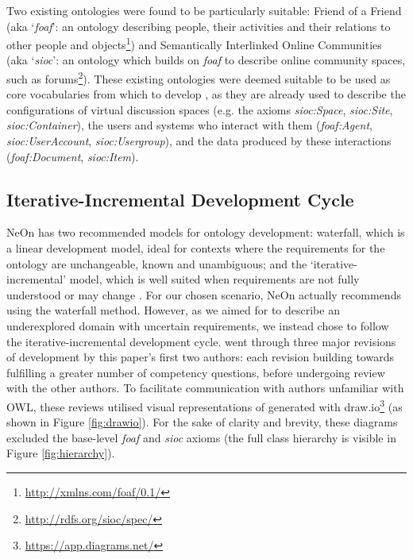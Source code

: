 Two existing ontologies were found to be particularly suitable: Friend of a Friend (aka `\textit{foaf}': an ontology describing people, their activities and their relations to other people and objects\footnote{\url{http://xmlns.com/foaf/0.1/}}) and Semantically Interlinked Online Communities (aka `\textit{sioc}': an ontology which builds on \textit{foaf} to describe online community spaces, such as forums\footnote{\url{http://rdfs.org/sioc/spec/}}). These existing ontologies were deemed suitable to be used as core vocabularies from which to develop \ONT{}, as they are already used to describe the configurations of virtual discussion spaces (e.g. the axioms \textit{sioc:Space}, \textit{sioc:Site}, \textit{sioc:Container}), the users and systems who interact with them (\textit{foaf:Agent}, \textit{sioc:UserAccount}, \textit{sioc:Usergroup}), and the data produced by these interactions (\textit{foaf:Document}, \textit{sioc:Item}).

\subsection{Iterative-Incremental Development Cycle}

NeOn has two recommended models for ontology development: waterfall, which is a linear development model, ideal for contexts where the requirements for the ontology are unchangeable, known and unambiguous; and the `iterative-incremental' model, which is well suited when requirements are not fully understood or may change \cite{suarez2012}.
For our chosen scenario, NeOn actually recommends using the waterfall method. However, as we aimed for \ONT{} to describe an underexplored domain with uncertain requirements, we instead chose to follow the iterative-incremental development cycle. \ONT{} went through three major revisions of development by this paper's first two authors: each revision building towards fulfilling a greater number of competency questions, before undergoing review with the other authors. To facilitate communication with authors unfamiliar with OWL, these reviews utilised visual representations of \ONT{} generated with draw.io\footnote{\url{https://app.diagrams.net/}} (as shown in Figure \ref{fig:drawio}). For the sake of clarity and brevity, these diagrams excluded the base-level \textit{foaf} and \textit{sioc} axioms (the full class hierarchy is visible in Figure \ref{fig:hierarchy}). 